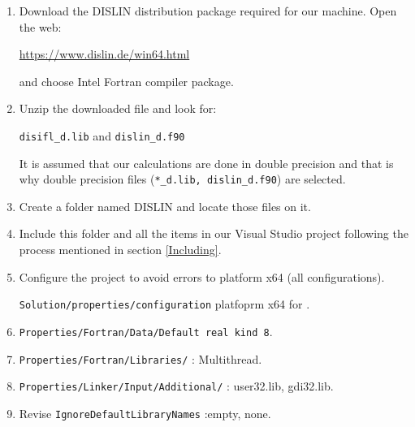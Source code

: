 \begin{enumerate}
     \setlength\itemsep{0.0cm}
    \item Download the DISLIN distribution package required for our machine. Open the web:
    
    \url{https://www.dislin.de/win64.html} 
    
    and choose Intel Fortran compiler package. 
    
    \item  Unzip the downloaded file and look for: 
    
    \texttt{disifl\_d.lib} and \texttt{dislin\_d.f90}
     
    It is assumed that our calculations are done in double precision and that is why double precision files (\texttt{*\_d.lib, dislin\_d.f90}) are selected. 
     
    \item Create a folder named DISLIN and locate those files on it. 
    
    \item Include this folder and all the items in our Visual Studio project following the process mentioned in section \ref{Including}.
    \item Configure the project to avoid errors to platform x64 (all configurations).
    
        \texttt{Solution/properties/configuration} platfoprm x64 for . 
    \item \texttt{Properties/Fortran/Data/Default real kind 8}. 
    
    \item \texttt{Properties/Fortran/Libraries/} : Multithread.
     
    \item \texttt{Properties/Linker/Input/Additional/} : user32.lib, gdi32.lib. 
        
    \item Revise \texttt{IgnoreDefaultLibraryNames} :empty, none.  
    
\end{enumerate}     
    
%    
%    
%    
 



